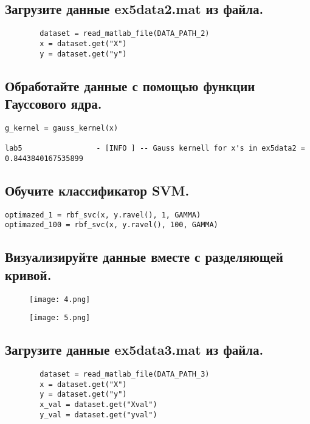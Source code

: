 \subsection{Загрузите данные ex5data2.mat из файла.}

\begin{lstlisting}
        dataset = read_matlab_file(DATA_PATH_2)
        x = dataset.get("X")
        y = dataset.get("y")
\end{lstlisting}

\subsection{Обработайте данные с помощью функции Гауссового ядра.}

\begin{lstlisting}
g_kernel = gauss_kernel(x)

lab5                 - [INFO ] -- Gauss kernell for x's in ex5data2 = 0.8443840167535899
\end{lstlisting}

\subsection{Обучите классификатор SVM.}

\begin{lstlisting}
optimazed_1 = rbf_svc(x, y.ravel(), 1, GAMMA)
optimazed_100 = rbf_svc(x, y.ravel(), 100, GAMMA)
\end{lstlisting}

\subsection{Визуализируйте данные вместе с разделяющей кривой.}

\begin{figure}[h]
\centering
    \texttt{[image: 4.png]}
    \label{sec:purpose:payings}
\end{figure}

\begin{figure}[h]
\centering
    \texttt{[image: 5.png]}
    \label{sec:purpose:payings}
\end{figure}

\subsection{Загрузите данные ex5data3.mat из файла.}

\begin{lstlisting}
        dataset = read_matlab_file(DATA_PATH_3)
        x = dataset.get("X")
        y = dataset.get("y")
        x_val = dataset.get("Xval")
        y_val = dataset.get("yval")
\end{lstlisting}

